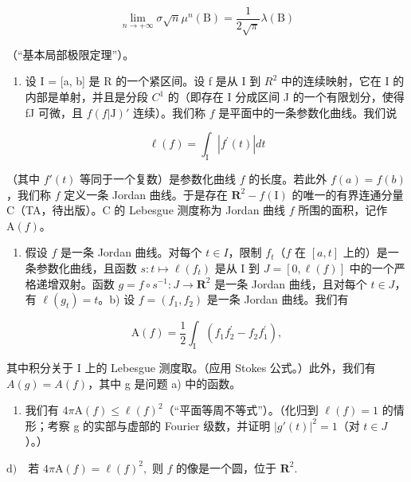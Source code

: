 \[
\lim _ {n \rightarrow + \infty} \sigma \sqrt {n} \mu^ {n} (\mathrm{B}) = \frac {1}{2 \sqrt {\pi}} \lambda (\mathrm{B})
\]

（“基本局部极限定理”）。

\begin{enumerate}
\def\labelenumi{\arabic{enumi})}
\setcounter{enumi}{43}
\tightlist
\item
  设 I = {[}a, b{]} 是 R 的一个紧区间。设 f 是从 I 到 \(R^{2}\) 中的连续映射，它在 I 的内部是单射，并且是分段 \(C^{1}\) 的（即存在 I 分成区间 J 的一个有限划分，使得 f\textbar J 可微，且 \(f(f|\mathrm{J})'\) 连续）。我们称 \(f\) 是平面中的一条参数化曲线。我们说
\end{enumerate}

\[
\ell (f) = \int_ {\mathrm{I}} | f ^ {\prime} (t) | d t
\]

（其中 \(f'(t)\) 等同于一个复数）是参数化曲线 \(f\) 的长度。若此外 \(f(a) = f(b)\)，我们称 \(f\) 定义一条 Jordan 曲线。于是存在 \(\mathbf{R}^2 - f(\mathrm{I})\) 的唯一的有界连通分量 C（TA，待出版）。C 的 Lebesgue 测度称为 Jordan 曲线 \(f\) 所围的面积，记作 \(\mathrm{A}(f)\)。

\begin{enumerate}
\def\labelenumi{\alph{enumi})}
\tightlist
\item
    假设 \(f\) 是一条 Jordan 曲线。对每个 \(t \in I\)，限制 \(f_t\)（\(f\) 在 \([a, t]\) 上的）是一条参数化曲线，且函数 \(s: t \mapsto \ell(f_t)\) 是从 I 到 \(J = [0, \ell(f)]\) 中的一个严格递增双射。函数 \(g = f \circ s^{-1}: J \to \mathbf{R}^2\) 是一条 Jordan 曲线，且对每个 \(t \in J\)，有 \(\ell(g_t) = t\)。b) 设 \(f = (f_1, f_2)\) 是一条 Jordan 曲线。我们有
\end{enumerate}

\[
\mathrm{A} (f) = \frac {1}{2} \int_ {\mathrm{I}} (f _ {1} f _ {2} ^ {\prime} - f _ {2} f _ {1} ^ {\prime}),
\]

其中积分关于 I 上的 Lebesgue 测度取。（应用 Stokes 公式。）此外，我们有 \(A(g) = A(f)\)，其中 g 是问题 a) 中的函数。

\begin{enumerate}
\def\labelenumi{\alph{enumi})}
\setcounter{enumi}{2}
\tightlist
\item
  我们有 \(4\pi\mathrm{A}(f)\leqslant\ell(f)^{2}\)（“平面等周不等式”）。（化归到 \(\ell(f)=1\) 的情形；考察 g 的实部与虚部的 Fourier 级数，并证明 \(|g'(t)|^{2}=1\)（对 \(t\in J\)）。）
\end{enumerate}

\(\text{d)}\quad\text{若 }4\pi\mathrm{A}(f)=\ell(f)^{2},\text{ 则 }f\text{ 的像是一个圆，位于 }\mathbf{R}^{2}.\)


